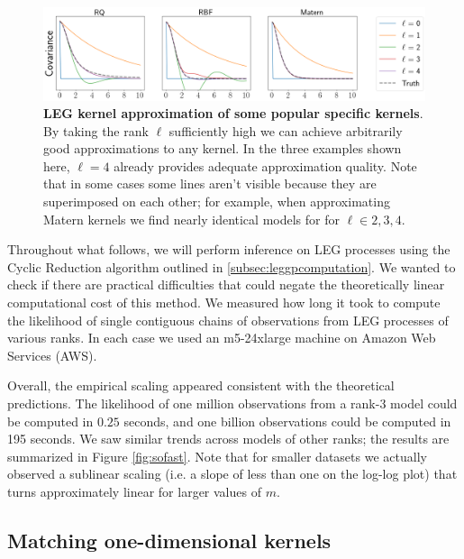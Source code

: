 \documentclass{article}
\theoremstyle{definition}
\begin{document}
\begin{figure}[t!]
\begin{center}
\centerline{\includegraphics[width=2\columnwidth]{pics/kernelfriends}}
\caption{\textbf{LEG kernel approximation of some popular specific kernels}.  
By taking the rank $\ell$ sufficiently high we can achieve arbitrarily good approximations to any kernel.  In the three examples shown here, $\ell=4$ already provides adequate approximation quality.  Note that in some cases some lines aren't visible because they are superimposed on each other; for example, when approximating Matern kernels we find nearly identical models for for $\ell \in {2,3,4}$.}
\label{fig:reppower}
\end{center}
\end{figure}

Throughout what follows, we will perform inference on LEG processes using the Cyclic Reduction algorithm outlined in \ref{subsec:leggpcomputation}. We wanted to check if there are practical difficulties that could negate the theoretically linear computational cost of this method.  We measured how long it took to compute the likelihood of single contiguous chains of observations from LEG processes of various ranks.  In each case we used an m5-24xlarge machine on Amazon Web Services (AWS).



Overall, the empirical scaling appeared consistent with the theoretical predictions.  The likelihood of one million observations from a rank-3 model could be computed in $0.25$ seconds, and one billion observations could be computed in 195 seconds.  We saw similar trends across models of other ranks; the results are summarized in Figure \ref{fig:sofast}.  Note that for smaller datasets we actually observed a sublinear scaling (i.e. a slope of less than one on the log-log plot) that turns approximately linear for larger values of $m$.


\subsection{Matching one-dimensional kernels}
\end{document}

